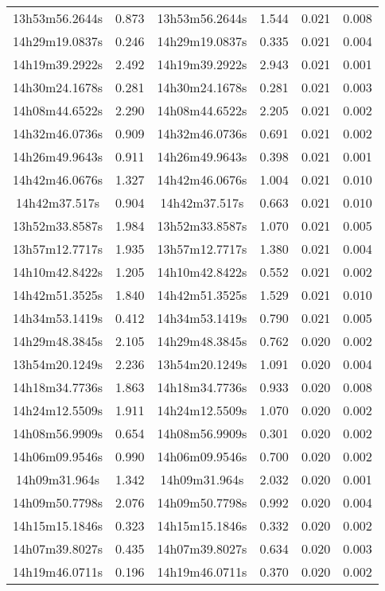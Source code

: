 \begin{table}
\begin{tabular}{cccccc}
13h53m56.2644s & 0.873 & 13h53m56.2644s & 1.544 & 0.021 & 0.008 \\
14h29m19.0837s & 0.246 & 14h29m19.0837s & 0.335 & 0.021 & 0.004 \\
14h19m39.2922s & 2.492 & 14h19m39.2922s & 2.943 & 0.021 & 0.001 \\
14h30m24.1678s & 0.281 & 14h30m24.1678s & 0.281 & 0.021 & 0.003 \\
14h08m44.6522s & 2.290 & 14h08m44.6522s & 2.205 & 0.021 & 0.002 \\
14h32m46.0736s & 0.909 & 14h32m46.0736s & 0.691 & 0.021 & 0.002 \\
14h26m49.9643s & 0.911 & 14h26m49.9643s & 0.398 & 0.021 & 0.001 \\
14h42m46.0676s & 1.327 & 14h42m46.0676s & 1.004 & 0.021 & 0.010 \\
14h42m37.517s & 0.904 & 14h42m37.517s & 0.663 & 0.021 & 0.010 \\
13h52m33.8587s & 1.984 & 13h52m33.8587s & 1.070 & 0.021 & 0.005 \\
13h57m12.7717s & 1.935 & 13h57m12.7717s & 1.380 & 0.021 & 0.004 \\
14h10m42.8422s & 1.205 & 14h10m42.8422s & 0.552 & 0.021 & 0.002 \\
14h42m51.3525s & 1.840 & 14h42m51.3525s & 1.529 & 0.021 & 0.010 \\
14h34m53.1419s & 0.412 & 14h34m53.1419s & 0.790 & 0.021 & 0.005 \\
14h29m48.3845s & 2.105 & 14h29m48.3845s & 0.762 & 0.020 & 0.002 \\
13h54m20.1249s & 2.236 & 13h54m20.1249s & 1.091 & 0.020 & 0.004 \\
14h18m34.7736s & 1.863 & 14h18m34.7736s & 0.933 & 0.020 & 0.008 \\
14h24m12.5509s & 1.911 & 14h24m12.5509s & 1.070 & 0.020 & 0.002 \\
14h08m56.9909s & 0.654 & 14h08m56.9909s & 0.301 & 0.020 & 0.002 \\
14h06m09.9546s & 0.990 & 14h06m09.9546s & 0.700 & 0.020 & 0.002 \\
14h09m31.964s & 1.342 & 14h09m31.964s & 2.032 & 0.020 & 0.001 \\
14h09m50.7798s & 2.076 & 14h09m50.7798s & 0.992 & 0.020 & 0.004 \\
14h15m15.1846s & 0.323 & 14h15m15.1846s & 0.332 & 0.020 & 0.002 \\
14h07m39.8027s & 0.435 & 14h07m39.8027s & 0.634 & 0.020 & 0.003 \\
14h19m46.0711s & 0.196 & 14h19m46.0711s & 0.370 & 0.020 & 0.002 \\

\end{tabular}
\end{table}
